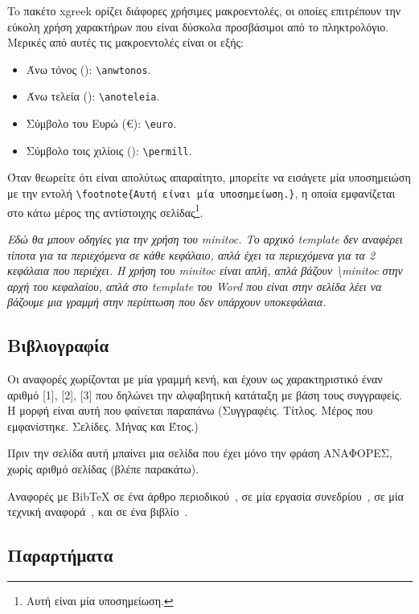 To πακέτο xgreek ορίζει διάφορες χρήσιμες μακροεντολές, οι οποίες επιτρέπουν την εύκολη χρήση χαρακτήρων που είναι δύσκολα προσβάσιμοι από το πληκτρολόγιο.
Μερικές από αυτές τις μακροεντολές είναι οι εξής:
\begin{itemize}
	\item Άνω τόνος (\anwtonos): \verb|\anwtonos|.
	\item Άνω τελεία (\anoteleia): \verb|\anoteleia|.
	\item Σύμβολο του Ευρώ (\euro): \verb|\euro|.
	\item Σύμβολο τοις χιλίοις (\permill): \verb|\permill|.
\end{itemize}

Όταν θεωρείτε ότι είναι απολύτως απαραίτητο, μπορείτε να εισάγετε μία υποσημειώση με την εντολή \verb|\footnote{Αυτή είναι μία υποσημείωση.}|, η οποία εμφανίζεται στο κάτω μέρος της αντίστοιχης σελίδας\footnote{Αυτή είναι μία υποσημείωση.}.

{\color{red}
\textit{Εδώ θα μπουν οδηγίες για την χρήση του minitoc. Το αρχικό
template δεν αναφέρει τίποτα για τα περιεχόμενα σε κάθε κεφάλαιο,
απλά έχει τα περιεχόμενα για τα 2 κεφάλαια που περιέχει. Η χρήση
του minitoc είναι απλή, απλά βάζουν \textbackslash minitoc στην αρχή του κεφαλαίου,
απλά στο template του Word που είναι στην σελίδα λέει να βάζουμε μια
γραμμή στην περίπτωση που δεν υπάρχουν υποκεφάλαια.}}

\subsection{Βιβλιογραφία}
\label{subsec:Bibliography}

{\color{red}
Οι αναφορές χωρίζονται με μία γραμμή κενή, και έχουν ως
χαρακτηριστικό έναν αριθμό [1], [2], [3] που δηλώνει την
αλφαβητική κατάταξη με βάση τους συγγραφείς. Η μορφή είναι αυτή
που φαίνεται παραπάνω (Συγγραφέις. Τίτλος. Μέρος που εμφανίστηκε.
Σελίδες. Μήνας και Έτος.)

Πριν την σελίδα αυτή μπαίνει μια σελίδα που έχει μόνο την φράση
ΑΝΑΦΟΡΕΣ, χωρίς αριθμό σελίδας (βλέπε παρακάτω).}

Αναφορές με BibTeX σε ένα άρθρο περιοδικού~\cite{Newman2003a}, σε μία εργασία συνεδρίου~\cite{DeCandia2007a}, σε μία τεχνική αναφορά~\cite{Jain1984a}, και σε ένα βιβλίο~\cite{Golumbic2004a}.

\subsection{Παραρτήματα}
\label{subsec:Appendices}

